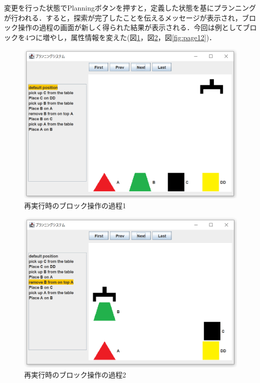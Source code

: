\documentclass[uplatex,12pt]{jsarticle}
\begin{document}
変更を行った状態でPlanningボタンを押すと，定義した状態を基にプランニングが行われる．すると，探索が完了したことを伝えるメッセージが表示され，ブロック操作の過程の画面が新しく得られた結果が表示される．今回は例としてブロックを4つに増やし，属性情報を変えた(図\ref{fig:page10}，図\ref{fig:page11}，図\ref{fig:page12})．\\

\begin{figure}[htbp]
  \begin{center}
    \includegraphics[scale=0.6]{images/page10.PNG}
    \caption{再実行時のブロック操作の過程1}
    \label{fig:page10}
  \end{center}
\end{figure}
\begin{figure}[htbp]
  \begin{center}
    \includegraphics[scale=0.6]{images/page11.PNG}
    \caption{再実行時のブロック操作の過程2}
    \label{fig:page11}
  \end{center}
\end{figure}
\end{document}
